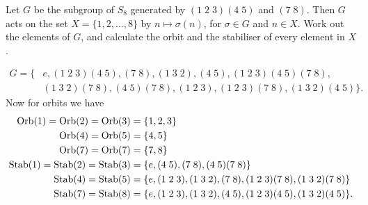 \setcounter{question}{39}
\question
Let $G$ be the subgroup of $S_8$ generated by 
$(1\;2\;3)(4\;5)$ and $(7\;8)$.
Then $G$ acts on the set $X = \{1, 2, \ldots, 8\}$ by
$n \mapsto \sigma(n)$, for $\sigma \in G$ and $n \in X$.
Work out the elements of $G$, 
and calculate the orbit and the stabiliser of every element in $X$.
\begin{solution}
    \begin{align*}
        G = \{
        &e, (1\;2\;3)(4\;5), (7\;8), (1\;3\;2), (4\;5), (1\;2\;3)(4\;5)(7\;8), \\
        &(1\;3\;2)(7\;8), (4\;5)(7\;8), (1\;2\;3), (1\;2\;3)(7\;8), (1\;3\;2)(4\;5)
        \}.
    \end{align*}
    Now for orbits we have
    \begin{align*}
        \operatorname{Orb}(1) = \operatorname{Orb}(2) = \operatorname{Orb}(3) 
        &= \{1,2,3\} \\
        \operatorname{Orb}(4) = \operatorname{Orb}(5) 
        &= \{4,5\} \\
        \operatorname{Orb}(7) = \operatorname{Orb}(7)
        &= \{7,8\} \\
        \operatorname{Stab}(1) = \operatorname{Stab}(2) = \operatorname{Stab}(3)
        &= \{e, (4\;5), (7\;8), (4\;5)(7\;8)\} \\
        \operatorname{Stab}(4) = \operatorname{Stab}(5)
        &= \{e, (1\;2\;3), (1\;3\;2), (7\;8), (1\;2\;3)(7\;8), (1\;3\;2)(7\;8)\} \\
        \operatorname{Stab}(7) = \operatorname{Stab}(8)
        &= \{e, (1\;2\;3), (1\;3\;2), (4\;5), (1\;2\;3)(4\;5), (1\;3\;2)(4\;5)\}.
    \end{align*}
\end{solution}
